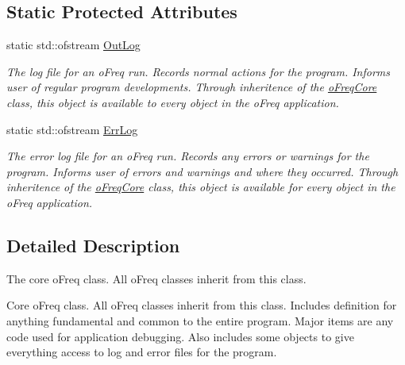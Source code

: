 \subsection*{Static Protected Attributes}
\begin{DoxyCompactItemize}
\item 
\hypertarget{classosea_1_1ofreq_1_1o_freq_core_a85b3e812b6d78c064ba375d5101bb053}{static std\-::ofstream \hyperlink{classosea_1_1ofreq_1_1o_freq_core_a85b3e812b6d78c064ba375d5101bb053}{Out\-Log}}\label{classosea_1_1ofreq_1_1o_freq_core_a85b3e812b6d78c064ba375d5101bb053}

\begin{DoxyCompactList}\small\item\em The log file for an o\-Freq run. Records normal actions for the program. Informs user of regular program developments. Through inheritence of the \hyperlink{classosea_1_1ofreq_1_1o_freq_core}{o\-Freq\-Core} class, this object is available to every object in the o\-Freq application. \end{DoxyCompactList}\item 
\hypertarget{classosea_1_1ofreq_1_1o_freq_core_a5e31044ee80fa436289e569c8080b21e}{static std\-::ofstream \hyperlink{classosea_1_1ofreq_1_1o_freq_core_a5e31044ee80fa436289e569c8080b21e}{Err\-Log}}\label{classosea_1_1ofreq_1_1o_freq_core_a5e31044ee80fa436289e569c8080b21e}

\begin{DoxyCompactList}\small\item\em The error log file for an o\-Freq run. Records any errors or warnings for the program. Informs user of errors and warnings and where they occurred. Through inheritence of the \hyperlink{classosea_1_1ofreq_1_1o_freq_core}{o\-Freq\-Core} class, this object is available for every object in the o\-Freq application. \end{DoxyCompactList}\end{DoxyCompactItemize}


\subsection{Detailed Description}
The core o\-Freq class. All o\-Freq classes inherit from this class. 

Core o\-Freq class. All o\-Freq classes inherit from this class. Includes definition for anything fundamental and common to the entire program. Major items are any code used for application debugging. Also includes some objects to give everything access to log and error files for the program. 

